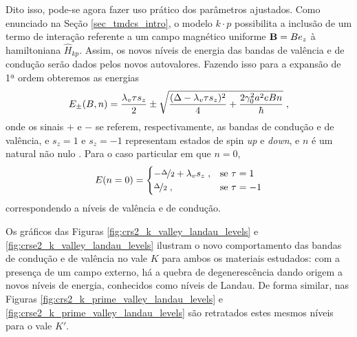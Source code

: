 Dito isso, pode-se agora fazer uso prático dos parâmetros ajustados. Como
enunciado na Seção \ref{sec_tmdcs_intro}, o modelo $ k \cdot p $ possibilita a
inclusão de um termo de interação referente a um campo magnético uniforme 
$ \mathbf{B} = B e_z $ à hamiltoniana $ \hat{H}_{kp} $. Assim, os novos níveis de
energia das bandas de valência e de condução serão dados pelos novos
autovalores. Fazendo isso para a expansão de 1ª ordem obteremos as energias
\begin{equation}
  E_\pm (B, n) = \frac{\lambda_v \tau s_z}{2} \pm 
  \sqrt{
    \frac{(\Delta - \lambda_v \tau s_z)^2}{4} + 
    \frac{2 \gamma_0^2 a^2 e B n}{\hbar}
  }
  \;\mathrm{,}
  \label{eq:landau_levels}
\end{equation}
onde os sinais $+$ e $-$ se referem, respectivamente, as bandas de condução e de
valência, e $ s_z = 1 $ e $ s_z = -1 $ representam estados de spin \textit{up} e
\textit{down}, e $n$ é um natural não nulo \cite{dias2016tmdc}. Para o caso
particular em que $ n = 0 $, 
\begin{equation}
  E(n = 0) =
  \begin{cases}
    - \nicefrac{\Delta}{2} + \lambda_v s_z \;, & \text{se } \tau = 1  \\
    \nicefrac{\Delta}{2}                   \;, & \text{se } \tau = -1 \\
  \end{cases}
  \label{eq:landau_level_for_null_n}
\end{equation}
correspondendo a níveis de valência e de condução.

Os gráficos das Figuras \ref{fig:crs2_k_valley_landau_levels} e
\ref{fig:crse2_k_valley_landau_levels} ilustram o novo comportamento das bandas
de condução e de valência no vale $K$ para ambos os materiais estudados: com a
presença de um campo externo, há a quebra de degenerescência dando origem a
novos níveis de energia, conhecidos como níveis de Landau. De forma similar, nas
Figuras \ref{fig:crs2_k_prime_valley_landau_levels} e
\ref{fig:crse2_k_prime_valley_landau_levels} são retratados estes mesmos níveis
para o vale $K'$.

